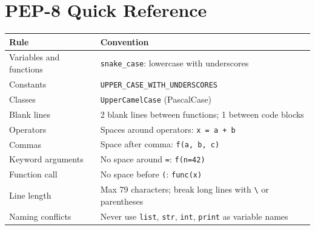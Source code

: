\documentclass[11pt,a4paper]{report}
\let\oldtexttt\texttt
\renewcommand{\texttt}[1]{\textcolor{mainblue}{\oldtexttt{#1}}}
\begin{document}
\section*{PEP-8 Quick Reference}
\small\renewcommand{\arraystretch}{1.3}
\centering
\begin{tabularx}{\textwidth}{@{}lX@{}}
\toprule
\textbf{Rule} & \textbf{Convention} \\ \midrule
Variables and functions & \texttt{snake\_case}: lowercase with underscores \\
Constants & \texttt{UPPER\_CASE\_WITH\_UNDERSCORES} \\
Classes & \texttt{UpperCamelCase} (PascalCase) \\
Blank lines & 2 blank lines between functions; 1 between code blocks \\
Operators & Spaces around operators: \texttt{x = a + b} \\
Commas & Space after comma: \texttt{f(a, b, c)} \\
Keyword arguments & No space around \texttt{=}: \texttt{f(n=42)} \\
Function call & No space before \texttt{(}: \texttt{func(x)} \\
Line length & Max 79 characters; break long lines with \texttt{\textbackslash} or parentheses \\
Naming conflicts & Never use \texttt{list}, \texttt{str}, \texttt{int}, \texttt{print} as variable names \\
\bottomrule
\end{tabularx}
\normalsize

\end{document}
